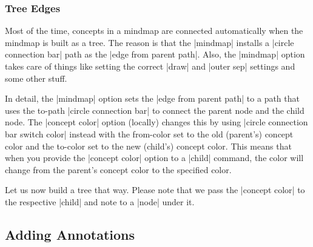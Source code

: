 \subsubsection{Tree Edges}

Most of the time, concepts in a mindmap are connected automatically when the
mindmap is built as a tree. The reason is that the |mindmap| installs a
|circle connection bar| path as the |edge from parent path|. Also, the
|mindmap| option takes care of things like setting the correct |draw| and
|outer sep| settings and some other stuff.

In detail, the |mindmap| option sets the |edge from parent path| to a path that
uses the to-path |circle connection bar| to connect the parent node and the
child node. The |concept color| option (locally) changes this by using
|circle connection bar switch color| instead with the from-color set to the old
(parent's) concept color and the to-color set to the new (child's) concept
color. This means that when you provide the |concept color| option to a |child|
command, the color will change from the parent's concept color to the specified
color.

Let us now build a tree that way. Please note that we pass the |concept color|
to the respective |child| and note to a |node| under it.
%
\begin{codeexample}[preamble={\usetikzlibrary{mindmap}}]
\end{codeexample}


\subsection{Adding Annotations}

